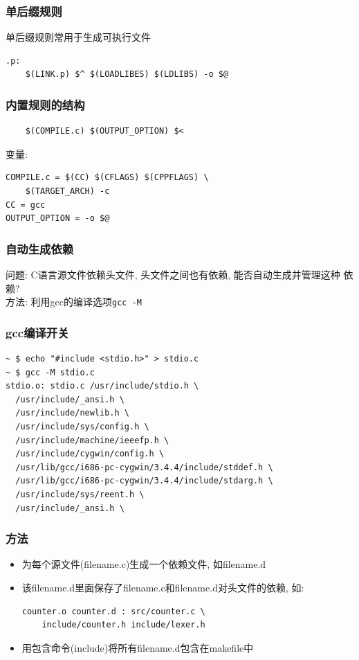 \documentclass[compress]{beamer}
\begin{document}
\begin{frame}[containsverbatim]
  \frametitle{单后缀规则}
单后缀规则常用于生成可执行文件 \\
\begin{Verbatim}[showtabs=true]
.p:
	$(LINK.p) $^ $(LOADLIBES) $(LDLIBS) -o $@
\end{Verbatim}
\end{frame}

\begin{frame}[containsverbatim]
\frametitle{内置规则的结构}

\begin{Verbatim}[showtabs=true]
%.o: %.c
	$(COMPILE.c) $(OUTPUT_OPTION) $<
\end{Verbatim}

变量:
\begin{Verbatim}[showtabs=true]
COMPILE.c = $(CC) $(CFLAGS) $(CPPFLAGS) \
	$(TARGET_ARCH) -c
CC = gcc
OUTPUT_OPTION = -o $@
\end{Verbatim}

\end{frame}

\begin{frame}[containsverbatim]
\frametitle{自动生成依赖}

问题: C语言源文件依赖头文件, 头文件之间也有依赖, 能否自动生成并管理这种
依赖? \\
方法: 利用gcc的编译选项\verb~gcc -M~ \\

\end{frame}


\begin{frame}[containsverbatim]
  \frametitle{gcc编译开关}
{\tiny
\begin{Verbatim}
~ $ echo "#include <stdio.h>" > stdio.c
~ $ gcc -M stdio.c
stdio.o: stdio.c /usr/include/stdio.h \
  /usr/include/_ansi.h \
  /usr/include/newlib.h \
  /usr/include/sys/config.h \
  /usr/include/machine/ieeefp.h \
  /usr/include/cygwin/config.h \
  /usr/lib/gcc/i686-pc-cygwin/3.4.4/include/stddef.h \
  /usr/lib/gcc/i686-pc-cygwin/3.4.4/include/stdarg.h \
  /usr/include/sys/reent.h \
  /usr/include/_ansi.h \
\end{Verbatim}
}

\end{frame}

\begin{frame}[containsverbatim]
\frametitle{方法}

\begin{itemize}
\item 为每个源文件(filename.c)生成一个依赖文件, 如filename.d
\item 该filename.d里面保存了filename.c和filename.d对头文件的依赖, 如: 
\begin{verbatim}
counter.o counter.d : src/counter.c \
	include/counter.h include/lexer.h
\end{verbatim}
\item 用包含命令(include)将所有filename.d包含在makefile中
\end{itemize}

\end{frame}
\end{document}
